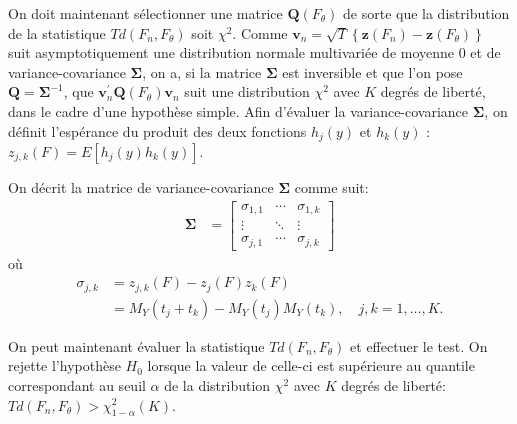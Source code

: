 On doit maintenant sélectionner une matrice $\mathbf{Q}(F_\theta)$ de
sorte que la distribution de la statistique $Td(F_n,F_\theta)$ soit
$\chi^2$. Comme $\mathbf{v}_n =
\sqrt{T}\left\{\mathbf{z}(F_n)-\mathbf{z}(F_\theta) \right\}$ suit
asymptotiquement une distribution normale multivariée de moyenne 0 et
de variance-covariance $\mathbf{\Sigma}$, on a, si la matrice
$\mathbf{\Sigma}$ est inversible et que l'on pose
$\mathbf{Q}=\mathbf{\Sigma}^{-1}$, que $\mathbf{v}_n^{\prime
}\mathbf{Q}(F_\theta)\mathbf{v}_n$ suit une distribution $\chi^2$ avec
$K$ degrés de liberté, dans le cadre d'une hypothèse simple.  Afin
d'évaluer la variance-covariance $\mathbf{\Sigma}$, on définit
l'espérance du produit des deux fonctions $h_j(y)$ et $h_k(y)$
:$z_{j,k}(F) = E[h_j(y)h_k(y)]$.

On décrit la matrice de variance-covariance $\mathbf{\Sigma}$ comme
suit:
\begin{align}
  \label{eq:14}
  \mathbf{\Sigma} &= \begin{bmatrix}
    \sigma_{1,1} & \cdots & \sigma_{1,k} \\
    \vdots & \ddots & \vdots \\
    \sigma_{j,1} & \cdots & \sigma_{j,k}
  \end{bmatrix}
\end{align}
où
\begin{align}
  \label{eq:10}
  \sigma_{j,k} &= z_{j,k}(F) - z_j(F)z_k(F)\nonumber\\
  &= M_Y(t_j+t_k) - M_Y(t_j)M_Y(t_k),\quad j,k=1,\ldots,K.
\end{align}

On peut maintenant évaluer la statistique $Td(F_n,F_\theta)$ et
effectuer le test. On rejette l'hypothèse $H_0$ lorsque la valeur de
celle-ci est supérieure au quantile correspondant au seuil $\alpha$ de
la distribution $\chi^2$ avec $K$ degrés de liberté:
$Td(F_n,F_\theta)>\chi^2_{1-\alpha}(K)$.


